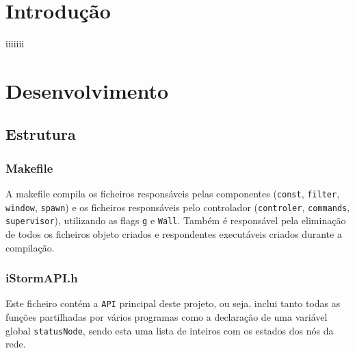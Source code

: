 \documentclass[12pt]{article}
\begin{document}
\section{Introdução}
iiiiiii




\newpage


\section{Desenvolvimento} 

\subsection{Estrutura}
\subsubsection{Makefile}
A makefile compila os ficheiros responsáveis pelas componentes (\texttt{const},  \texttt{filter}, \texttt{window}, \texttt{spawn}) e os ficheiros responsáveis pelo controlador (\texttt{controler}, \texttt{commands}, \texttt{supervisor}), utilizando as flags \texttt{g} e \texttt{Wall}. Também é responsável pela eliminação de todos os ficheiros objeto criados e respondentes executáveis criados durante a compilação.

\subsubsection{iStormAPI.h}
Este ficheiro contém a \texttt{API} principal deste projeto, ou seja, inclui tanto todas as funções partilhadas por vários programas como  a declaração de uma variável global \texttt{statusNode}, sendo esta uma lista de inteiros com os estados dos nós da rede.
\end{document}
